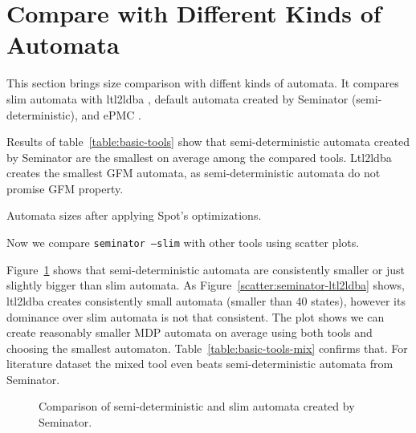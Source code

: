 \documentclass[
	digital,
nolof, nolot
]{fithesis3}
\begin{document}
	\clearpage
		\section{Compare with Different Kinds of Automata}
		This section brings size comparison with diffent kinds of automata. It compares slim automata with ltl2ldba \cite{ltl2ldba}, default automata created by Seminator (semi-deterministic), and ePMC \cite{epmc}.
		
		Results of table~\ref{table:basic-tools} show that semi-deterministic automata created by Seminator are the smallest on average among the compared tools. Ltl2ldba creates the smallest GFM automata, as semi-deterministic automata do not promise GFM property.
		
		\begin{table}[ht]
			\centering
			
			\caption{Automata sizes after applying Spot's optimizations.}
			\label{table:basic-tools}
			
		\end{table}
		
		
		
		Now we compare \texttt{seminator --slim} with other tools using scatter plots.
		
		Figure~\ref{scatter:seminator-slim-default} shows that semi-deterministic automata are consistently smaller or just slightly bigger than slim automata. 
		As Figure~\ref{scatter:seminator-ltl2ldba} shows, ltl2ldba creates consistently small automata (smaller than 40 states), however its dominance over slim automata is not that consistent. The plot shows we can create reasonably smaller MDP automata on average using both tools and choosing the smallest automaton. Table~\ref{table:basic-tools-mix} confirms that. For literature dataset the mixed tool even beats semi-deterministic automata from Seminator.
		\begin{figure}[ht]
			\centering
			
			\caption{Comparison of semi-deterministic and slim automata created by Seminator.}
			\label{scatter:seminator-slim-default}
			\begin{tikzpicture}
				
			\end{tikzpicture}
		\end{figure}
		
\end{document}
